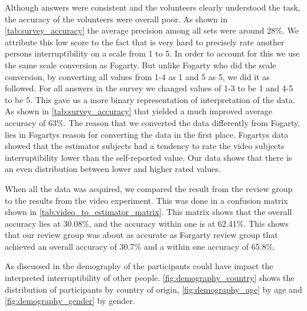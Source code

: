 \documentclass{sigchi}
\begin{document}
Although answers were consistent and the volunteers clearly understood the task, the accuracy of the volunteers were overall poor.
As shown in \autoref{tab:survey_accuracy} the average precision among all sets were around 28\%.
We attribute this low score to the fact that is very hard to precisely rate another persons interruptibility on a scale from 1 to 5.
In order to account for this we use the same scale conversion as Fogarty\cite{fogarty2005predicting}.
But unlike Fogarty who did the scale conversion, by converting all values from 1-4 as 1 and 5 as 5, we did it as followed.
For all answers in the survey we changed values of 1-3 to be 1 and 4-5 to be 5.
This gave us a more binary representation of interpretation of the data.
As shown in \autoref{tab:survey_accuracy} that yielded a much improved average accuracy of 63\%.
The reason that we converted the data differently from Fogarty, lies in Fogartys reason for converting the data in the first place.
Fogartys data showed that the estimator subjects had a tendency to rate the video subjects interruptibility lower than the self-reported value.
Our data shows that there is an even distribution between lower and higher rated values.

When all the data was acquired, we compared the result from the review group to the results from the video experiment.
This was done in a confusion matrix shown in \autoref{tab:video_to_estimator_matrix}.
This matrix shows that the overall accuracy lies at 30.08\%, and the accuracy within one is at 62.41\%.
This shows that our review group was about as accurate as Forgarty review group \cite{fogarty2005predicting} that achieved an overall accuracy of 30.7\% and a within one accuracy of 65.8\%.

As discussed in  the demography of the participants could have impact the interpreted interruptibility of other people.
\autoref{fig:demography_country} shows the distribution of participants by country of origin, \autoref{fig:demography_age} by age and \autoref{fig:demography_gender} by gender.
\end{document}
